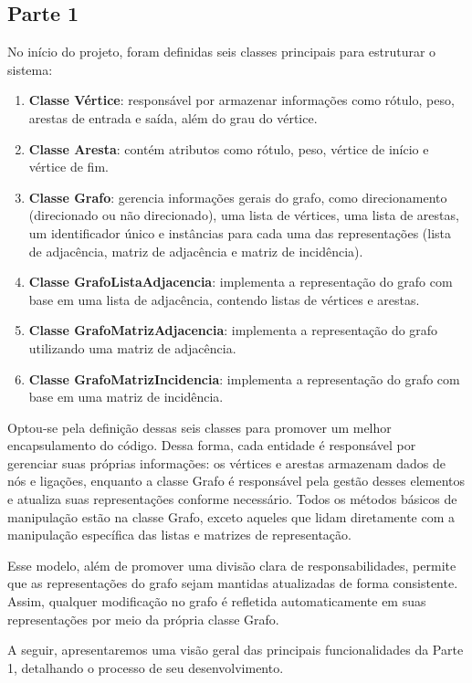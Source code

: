 \documentclass[12pt]{article}
\begin{document}
\subsection{Parte 1}

No início do projeto, foram definidas seis classes principais para estruturar o sistema:

\begin{enumerate}
\item \textbf{Classe Vértice}: responsável por armazenar informações como rótulo, peso, arestas de entrada e saída, além do grau do vértice.
\item \textbf{Classe Aresta}: contém atributos como rótulo, peso, vértice de início e vértice de fim.
\item \textbf{Classe Grafo}: gerencia informações gerais do grafo, como direcionamento (direcionado ou não direcionado), uma lista de vértices, uma lista de arestas, um identificador único e instâncias para cada uma das representações (lista de adjacência, matriz de adjacência e matriz de incidência).
\item \textbf{Classe GrafoListaAdjacencia}: implementa a representação do grafo com base em uma lista de adjacência, contendo listas de vértices e arestas.
\item \textbf{Classe GrafoMatrizAdjacencia}: implementa a representação do grafo utilizando uma matriz de adjacência.
\item \textbf{Classe GrafoMatrizIncidencia}: implementa a representação do grafo com base em uma matriz de incidência.
\end{enumerate}

Optou-se pela definição dessas seis classes para promover um melhor encapsulamento do código. Dessa forma, cada entidade é responsável por gerenciar suas próprias informações: os vértices e arestas armazenam dados de nós e ligações, enquanto a classe Grafo é responsável pela gestão desses elementos e atualiza suas representações conforme necessário. Todos os métodos básicos de manipulação estão na classe Grafo, exceto aqueles que lidam diretamente com a manipulação específica das listas e matrizes de representação.

Esse modelo, além de promover uma divisão clara de responsabilidades, permite que as representações do grafo sejam mantidas atualizadas de forma consistente. Assim, qualquer modificação no grafo é refletida automaticamente em suas representações por meio da própria classe Grafo.

A seguir, apresentaremos uma visão geral das principais funcionalidades da Parte 1, detalhando o processo de seu desenvolvimento.
\end{document}
